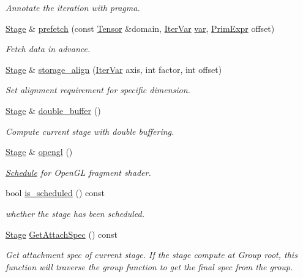 \begin{DoxyCompactItemize}
\begin{DoxyCompactList}\small\item\em Annotate the iteration with pragma. \end{DoxyCompactList}\item 
\hyperlink{classtvm_1_1te_1_1Stage}{Stage} \& \hyperlink{classtvm_1_1te_1_1Stage_a611327890918fb641a8e65396ab9c5f6}{prefetch} (const \hyperlink{classtvm_1_1te_1_1Tensor}{Tensor} \&domain, \hyperlink{classtvm_1_1tir_1_1IterVar}{Iter\+Var} \hyperlink{namespacetvm_1_1te_ae0c71f84710b436cbe0b32289d0838f4}{var}, \hyperlink{classtvm_1_1PrimExpr}{Prim\+Expr} offset)
\begin{DoxyCompactList}\small\item\em Fetch data in advance. \end{DoxyCompactList}\item 
\hyperlink{classtvm_1_1te_1_1Stage}{Stage} \& \hyperlink{classtvm_1_1te_1_1Stage_aa73e3a269d84c3b4f0a1994371d67bab}{storage\+\_\+align} (\hyperlink{classtvm_1_1tir_1_1IterVar}{Iter\+Var} axis, int factor, int offset)
\begin{DoxyCompactList}\small\item\em Set alignment requirement for specific dimension. \end{DoxyCompactList}\item 
\hyperlink{classtvm_1_1te_1_1Stage}{Stage} \& \hyperlink{classtvm_1_1te_1_1Stage_a0cdea4d4b25b730c44d86e6c57505000}{double\+\_\+buffer} ()
\begin{DoxyCompactList}\small\item\em Compute current stage with double buffering. \end{DoxyCompactList}\item 
\hyperlink{classtvm_1_1te_1_1Stage}{Stage} \& \hyperlink{classtvm_1_1te_1_1Stage_a0728134ed00dd97169d4e6cec6fe0e8f}{opengl} ()
\begin{DoxyCompactList}\small\item\em \hyperlink{classtvm_1_1te_1_1Schedule}{Schedule} for Open\+GL fragment shader. \end{DoxyCompactList}\item 
bool \hyperlink{classtvm_1_1te_1_1Stage_af6aa745f05336b8afcd5b0b6d2fd9cb6}{is\+\_\+scheduled} () const 
\begin{DoxyCompactList}\small\item\em whether the stage has been scheduled. \end{DoxyCompactList}\item 
\hyperlink{classtvm_1_1te_1_1Stage}{Stage} \hyperlink{classtvm_1_1te_1_1Stage_a9431049e6573f40af10b02e7cd8d8efc}{Get\+Attach\+Spec} () const 
\begin{DoxyCompactList}\small\item\em Get attachment spec of current stage. If the stage compute at Group root, this function will traverse the group function to get the final spec from the group. \end{DoxyCompactList}\end{DoxyCompactItemize}


